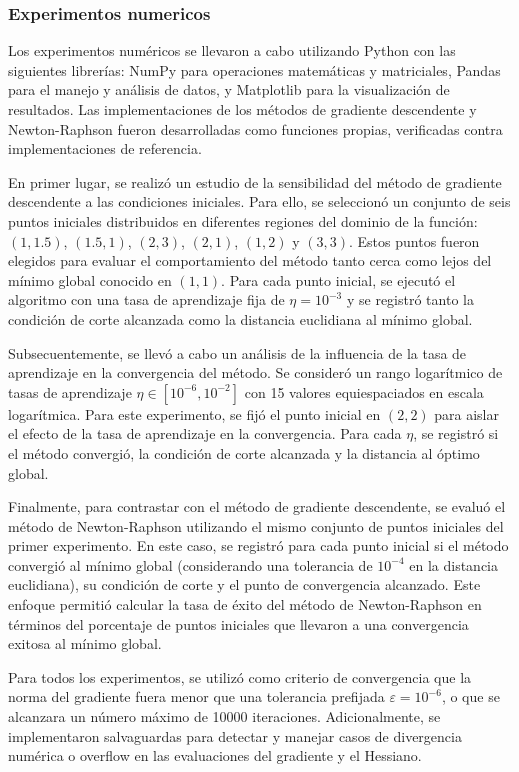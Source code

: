 \documentclass{tp02}
\begin{document}
\subsubsection{Experimentos numericos}

Los experimentos numéricos se llevaron a cabo utilizando Python con las siguientes librerías:
NumPy para operaciones matemáticas y matriciales, Pandas para el manejo y análisis de datos,
y Matplotlib para la visualización de resultados. Las implementaciones de los métodos de
gradiente descendente y Newton-Raphson fueron desarrolladas como funciones propias,
verificadas contra implementaciones de referencia.

En primer lugar, se realizó un estudio de la sensibilidad del método de gradiente
descendente a las condiciones iniciales. Para ello, se seleccionó un conjunto de seis puntos
iniciales distribuidos en diferentes regiones del dominio de la función:
$(1, 1.5)$, $(1.5, 1)$, $(2, 3)$, $(2, 1)$, $(1, 2)$ y $(3, 3)$. Estos puntos fueron
elegidos para evaluar el comportamiento del método tanto cerca como lejos del mínimo global
conocido en $(1, 1)$. Para cada punto inicial, se ejecutó el algoritmo con una tasa de
aprendizaje fija de $\eta = 10^{-3}$ y se registró tanto la condición de corte alcanzada
como la distancia euclidiana al mínimo global.

Subsecuentemente, se llevó a cabo un análisis de la influencia de la tasa de aprendizaje
en la convergencia del método. Se consideró un rango logarítmico de tasas de aprendizaje
$\eta \in [10^{-6}, 10^{-2}]$ con 15 valores equiespaciados en escala logarítmica. Para
este experimento, se fijó el punto inicial en $(2, 2)$ para aislar el efecto de la tasa
de aprendizaje en la convergencia. Para cada $\eta$, se registró si el método convergió,
la condición de corte alcanzada y la distancia al óptimo global.

Finalmente, para contrastar con el método de gradiente descendente, se evaluó el método
de Newton-Raphson utilizando el mismo conjunto de puntos iniciales del primer experimento.
En este caso, se registró para cada punto inicial si el método convergió al mínimo global
(considerando una tolerancia de $10^{-4}$ en la distancia euclidiana), su condición de
corte y el punto de convergencia alcanzado. Este enfoque permitió calcular la tasa de
éxito del método de Newton-Raphson en términos del porcentaje de puntos iniciales que
llevaron a una convergencia exitosa al mínimo global.

Para todos los experimentos, se utilizó como criterio de convergencia que la norma del
gradiente fuera menor que una tolerancia prefijada $\varepsilon = 10^{-6}$, o que se
alcanzara un número máximo de 10000 iteraciones. Adicionalmente, se implementaron
salvaguardas para detectar y manejar casos de divergencia numérica o overflow en las
evaluaciones del gradiente y el Hessiano.
\end{document}
